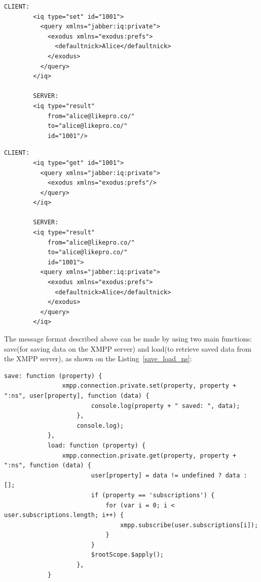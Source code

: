     \begin{lstlisting}[label=code:client_save,caption=Client Stores Private Data]
		CLIENT:
		<iq type="set" id="1001">
		  <query xmlns="jabber:iq:private">
		    <exodus xmlns="exodus:prefs">
		      <defaultnick>Alice</defaultnick>
		    </exodus>
		  </query>
		</iq>

		SERVER:
		<iq type="result"
		    from="alice@likepro.co/"
		    to="alice@likepro.co/"
		    id="1001"/>
    \end{lstlisting}

     \begin{lstlisting}[label=code:client_load,caption=Client Retrieves Private Data]
		CLIENT:
		<iq type="get" id="1001">
		  <query xmlns="jabber:iq:private">
		    <exodus xmlns="exodus:prefs"/>
		  </query>
		</iq>

		SERVER:
		<iq type="result"
		    from="alice@likepro.co/"
		    to="alice@likepro.co/"
		    id="1001">
		  <query xmlns="jabber:iq:private">
		    <exodus xmlns="exodus:prefs">
		      <defaultnick>Alice</defaultnick>
		    </exodus>
		  </query>
		</iq>
    \end{lstlisting}

    The message format described above can be made by using two main functions: save(for saving data on the XMPP server) and load(to retrieve saved data from the XMPP server), as shown on the Listing~\ref{save_load_ns}:
	\begin{lstlisting}[label=save_load_ns,caption=Snippet of Save/Load preferences to a private namespace]
	      	save: function (property) {
	            xmpp.connection.private.set(property, property + ":ns", user[property], function (data) {
	                    console.log(property + " saved: ", data);
	                },
	                console.log);
	        },
	        load: function (property) {
	            xmpp.connection.private.get(property, property + ":ns", function (data) {
	                    user[property] = data != undefined ? data : [];
	                    if (property == 'subscriptions') {
	                        for (var i = 0; i < user.subscriptions.length; i++) {
	                            xmpp.subscribe(user.subscriptions[i]);
	                        }
	                    }
	                    $rootScope.$apply();
	                },
	        }
	\end{lstlisting}



